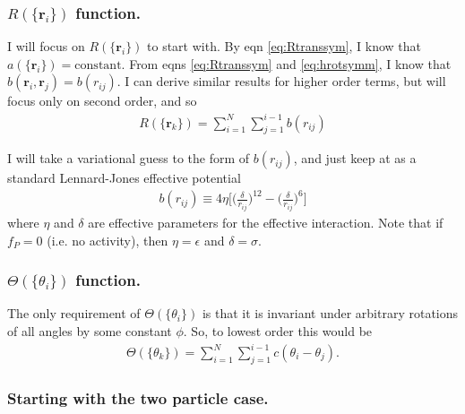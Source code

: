 \documentclass{article}
\begin{document}
\subsubsection{$R(\{\bm{r}_i\})$ function.}

I will focus on $R(\{\bm{r}_i\})$ to start with. By eqn \ref{eq:Rtranssym}, I know that
$a(\{\bm{r}_i\})=\mathrm{constant}$. From eqns \ref{eq:Rtranssym} and \ref{eq:hrotsymm}, I know
that $b(\bm{r}_i,\bm{r}_j)=b(r_{ij})$. I can derive similar results for higher order
terms, but will focus only on second order, and so
\begin{align}
  R(\{\bm{r}_k\})= \sum_{i=1}^N\sum_{j=1}^{i-1}b(r_{ij})
\end{align}

I will take a variational guess to the form of $b(r_{ij})$, and just keep at as a standard
Lennard-Jones effective potential
\begin{align}
  b(r_{ij})\equiv 4\eta\bigg[\bigg(\frac{\delta}{r_{ij}}\bigg)^{12}-
  \bigg(\frac{\delta}{r_{ij}}\bigg)^6\bigg]
\end{align}
where $\eta$ and $\delta$ are effective parameters for the effective interaction. Note that if
$f_P=0$ (i.e. no activity), then $\eta=\epsilon$ and $\delta=\sigma$.

\subsubsection{$\Theta(\{\theta_i\})$ function.}

The only requirement of $\Theta(\{\theta_i\})$ is that it is invariant under arbitrary rotations
of all angles by some constant $\phi$. So, to lowest order this would be
\begin{align}
  \Theta(\{\theta_k\})=\sum_{i=1}^N\sum_{j=1}^{i-1}c(\theta_i-\theta_j).
\end{align}

\subsubsection{Starting with the two particle case.}
\end{document}
